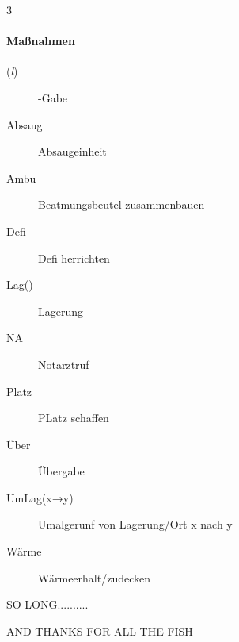 \documentclass[
ngerman,
paper=a4,
asymmetric,
fontsize=9pt,
draft=false,
parskip=half,
footnotes=multiple,
toc=flat,
]{scrbook}
\begin{document}
\begin{WidePar}
\begin{multicols}{3}
\paragraph{Maßnahmen}

\begin{description}
  \item[(\emph{l})] -Gabe
  \item[Absaug] Absaugeinheit
  \item[Ambu] Beatmungsbeutel zusammenbauen
  \item[Defi] Defi herrichten
  \item[Lag()] Lagerung
  \item[NA] Notarztruf
  \item[Platz] PLatz schaffen
  \item[Über] Übergabe
  \item[UmLag(x→y)] Umalgerunf von Lagerung/Ort x nach y
  \item[Wärme] Wärmeerhalt/zudecken
\end{description}
\end{multicols}
\end{WidePar}




SO LONG..........

AND THANKS FOR ALL THE FISH

\EndMulticolTOC
\end{document}
